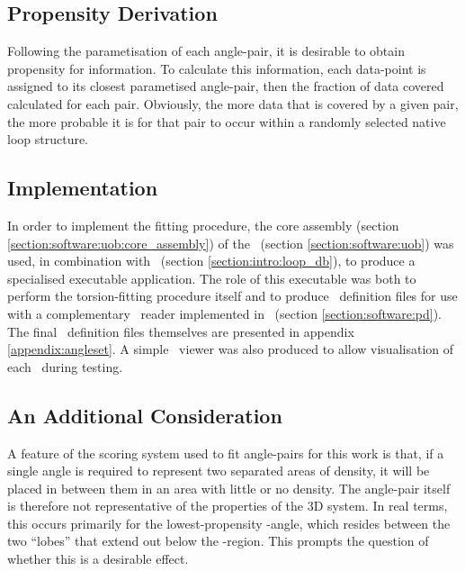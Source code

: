 \subsection{Propensity Derivation}

Following the parametisation of each angle-pair, it is desirable to obtain propensity for information. To calculate this information, each data-point is assigned to its closest parametised angle-pair, then the fraction of data covered calculated for each pair.
Obviously, the more data that is covered by a given pair, the more probable it is for that pair to occur within a randomly selected native loop structure.
\subsection{Implementation}

In order to implement the fitting procedure, the core assembly (section \ref{section:software:uob:core_assembly}) of the \uobf\ (section \ref{section:software:uob}) was used, in combination with \thothloopdb\ (section \ref{section:intro:loop_db}), to produce a specialised executable application. The role of this executable was both to perform the torsion-fitting procedure itself and to produce \angleset\ definition files for use with a complementary \angleset\ reader implemented in \pd\ (section \ref{section:software:pd}).
The final \angleset \ definition files themselves are presented in appendix \ref{appendix:angleset}.
A simple \angleset\ viewer was also produced to allow visualisation of each \angleset\ during testing.

\subsection{An Additional Consideration}

A feature of the scoring system used to fit angle-pairs for this work is that, if a single angle is required to represent two separated areas of density, it will be placed in between them in an area with little or no density.
The angle-pair itself is therefore not representative of the properties of the 3D system. In real terms, this occurs primarily for the lowest-propensity \be-angle, which resides between the two ``lobes'' that extend out below the \be-region.
This prompts the question of whether this is a desirable effect. 

